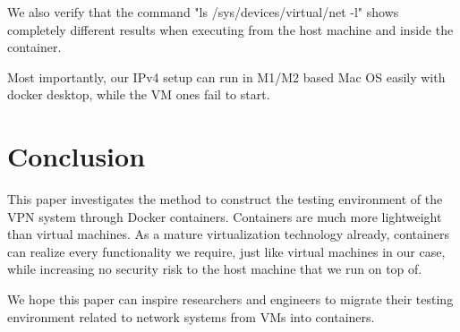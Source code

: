 \documentclass[article]{aaltoseries}
\begin{document}
We also verify that the command "ls /sys/devices/virtual/net -l" shows completely different results when executing from the host machine and inside the container.

Most importantly, our IPv4 setup can run in M1/M2 based Mac OS easily with docker desktop, while the VM ones fail to start.



\section{Conclusion}

This paper investigates the method to construct the testing environment of the VPN system through Docker containers. Containers are much more lightweight than virtual machines. As a mature virtualization technology already, containers can realize every functionality we require, just like virtual machines in our case, while increasing no security risk to the host machine that we run on top of.

We hope this paper can inspire researchers and engineers to migrate their testing environment related to network systems from VMs into containers.










\end{document}
